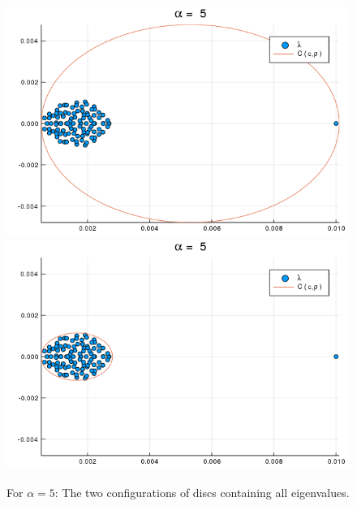 \begin{figure}[h!]
\centering
\includegraphics[scale=0.4]{../task2/images/Task2_b_a5_1.png}
\includegraphics[scale=0.4]{../task2/images/Task2_b_a5_2.png}
\caption{For $\alpha = 5$: The two configurations of discs containing all eigenvalues.}
\label{fig:task2b_5}
\end{figure}

